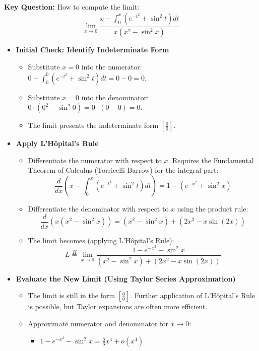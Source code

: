 \hfill

\begin{cascade}
	\textbf{Key Question:} How to compute the limit: $$\lim_{x \to 0} \frac{x - \int_0^x (e^{-t^2} + \sin^2 t) dt}{x(x^2 - \sin^2 x)}$$
	\begin{itemize}
		\item \textbf{Initial Check: Identify Indeterminate Form}
		      \begin{itemize}
			      \item Substitute $x=0$ into the numerator: $0 - \int_0^0 (e^{-t^2} + \sin^2 t) dt = 0 - 0 = 0$.
			      \item Substitute $x=0$ into the denominator: $0 \cdot (0^2 - \sin^2 0) = 0 \cdot (0 - 0) = 0$.
			      \item The limit presents the indeterminate form $\left[\frac{0}{0}\right]$.
		      \end{itemize}
		\item \textbf{Apply L'Hôpital's Rule}
		      \begin{itemize}
			      \item Differentiate the numerator with respect to $x$. Requires the Fundamental Theorem of Calculus (Torricelli-Barrow) for the integral part:
			            \[ \frac{d}{dx} \left( x - \int_0^x (e^{-t^2} + \sin^2 t) dt \right) = 1 - (e^{-x^2} + \sin^2 x) \]
			      \item Differentiate the denominator with respect to $x$ using the product rule:
			            \[ \frac{d}{dx} (x(x^2 - \sin^2 x)) = (x^2 - \sin^2 x) + (2x^2 - x\sin(2x)) \]
			      \item The limit becomes (applying L'Hôpital's Rule):
			            \[ L \stackrel{H}{=} \lim_{x \to 0} \frac{1 - e^{-x^2} - \sin^2 x}{(x^2 - \sin^2 x) + (2x^2 - x\sin(2x))} \]
		      \end{itemize}
		\item \textbf{Evaluate the New Limit (Using Taylor Series Approximation)}
		      \begin{itemize}
			      \item The limit is still in the form $\left[\frac{0}{0}\right]$. Further application of L'Hôpital's Rule is possible, but Taylor expansions are often more efficient.
			      \item Approximate numerator and denominator for $x \to 0$:
			            \begin{itemize}
				            \item $1 - e^{-x^2} - \sin^2 x = \frac{5}{6}x^4 + o(x^4)$

\end{itemize}
\end{itemize}
\end{itemize}
\end{cascade}

